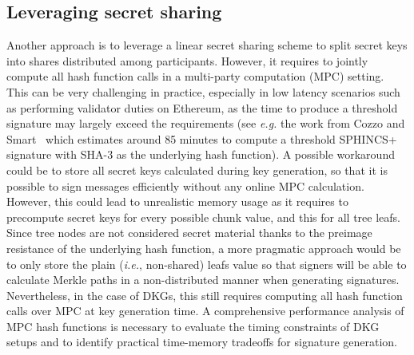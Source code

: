 \subsection{Leveraging secret sharing}
Another approach is to leverage a linear secret sharing scheme to split \WOTS secret keys into shares distributed among participants.
However, it requires to jointly compute all hash function calls in a multi-party computation (MPC) setting.
This can be very challenging in practice, especially in low latency scenarios such as performing validator duties on Ethereum, as the time to produce a threshold signature may largely exceed the requirements (see \textit{e.g.} the work from Cozzo and Smart~\cite{sharing_luov19} which estimates around 85 minutes to compute a threshold \textsf{SPHINCS+} signature with \textsf{SHA-3} as the underlying hash function).
A possible workaround could be to store all secret keys calculated during key generation, so that it is possible to sign messages efficiently without any online MPC calculation.
However, this could lead to unrealistic memory usage as it requires to precompute secret keys for every possible chunk value, and this for all tree leafs.
Since tree nodes are not considered secret material thanks to the preimage resistance of the underlying hash function, a more pragmatic approach would be to only store the plain (\textit{i.e.}, non-shared) leafs value so that signers will be able to calculate Merkle paths in a non-distributed manner when generating signatures.
Nevertheless, in the case of DKGs, this still requires computing all hash function calls over MPC at key generation time.
A comprehensive performance analysis of MPC hash functions is necessary to evaluate the timing constraints of DKG setups and to identify practical time-memory tradeoffs for signature generation.







